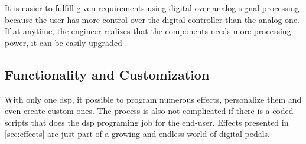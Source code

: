 It is easier to fulfill given requirements using digital over analog signal processing because the user has more control over the digital controller than the analog one. If at anytime, the engineer realizes that the components needs more processing power, it can be easily upgraded \citep{analog_requirements}.

\subsection{Functionality and Customization}

With only one \gls{dsp}, it possible to program numerous effects, personalize them and even create custom ones. The process is also not complicated if there is a coded scripts that does the \gls{dsp} programing job for the end-user. Effects presented in \autoref{sec:effects} are just part of a growing and endless world of digital pedals. 

 